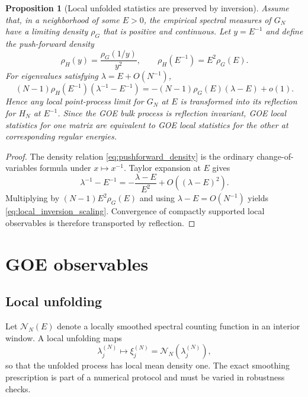 \documentclass[11pt]{amsart}
\numberwithin{equation}{section}
\theoremstyle{plain}
\newtheorem{proposition}[theorem]{Proposition}
\theoremstyle{definition}
\theoremstyle{remark}
\begin{document}
\begin{proposition}[Local unfolded statistics are preserved by inversion]
\label{prop:local_inversion_equivalence}
Assume that, in a neighborhood of some $E>0$, the empirical spectral measures of $G_N$ have a limiting density $\rho_G$ that is positive and continuous.  Let $y=E^{-1}$ and define the push-forward density
\begin{equation}
\rho_H(y)=\frac{\rho_G(1/y)}{y^2},
\qquad
\rho_H(E^{-1})=E^2\rho_G(E).
\label{eq:pushforward_density}
\end{equation}
For eigenvalues satisfying $\lambda=E+O(N^{-1})$,
\begin{equation}
(N-1)\rho_H(E^{-1})
\left(\lambda^{-1}-E^{-1}\right)
=
-(N-1)\rho_G(E)(\lambda-E)+o(1).
\label{eq:local_inversion_scaling}
\end{equation}
Hence any local point-process limit for $G_N$ at $E$ is transformed into its reflection for $H_N$ at $E^{-1}$.  Since the GOE bulk process is reflection invariant, GOE local statistics for one matrix are equivalent to GOE local statistics for the other at corresponding regular energies.
\end{proposition}

\begin{proof}
The density relation \eqref{eq:pushforward_density} is the ordinary change-of-variables formula under $x\mapsto x^{-1}$.  Taylor expansion at $E$ gives
\begin{equation}
\lambda^{-1}-E^{-1}
=-\frac{\lambda-E}{E^2}+O\!\left((\lambda-E)^2\right).
\end{equation}
Multiplying by $(N-1)E^2\rho_G(E)$ and using $\lambda-E=O(N^{-1})$ yields \eqref{eq:local_inversion_scaling}.  Convergence of compactly supported local observables is therefore transported by reflection.
\end{proof}

\section{GOE observables}
\label{sec:goe_observables}

\subsection{Local unfolding}
\label{subsec:unfolding}

Let $\mathcal N_N(E)$ denote a locally smoothed spectral counting function in an interior window.  A local unfolding maps
\begin{equation}
\lambda_j^{(N)}\longmapsto
\xi_j^{(N)}=\mathcal N_N\!\left(\lambda_j^{(N)}\right),
\label{eq:local_unfolding}
\end{equation}
so that the unfolded process has local mean density one.  The exact smoothing prescription is part of a numerical protocol and must be varied in robustness checks.
\end{document}
